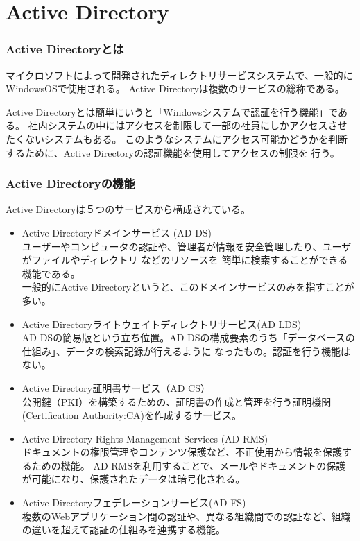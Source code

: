 \documentclass[11pt,a4j,titlepage]{jreport}
\begin{document}
\section{Active Directory}\label{Active Directory}
\subsubsection*{Active Directoryとは}
マイクロソフトによって開発されたディレクトリサービスシステムで、一般的にWindowsOSで使用される。
Active Directoryは複数のサービスの総称である。


Active Directoryとは簡単にいうと「Windowsシステムで認証を行う機能」である。
社内システムの中にはアクセスを制限して一部の社員にしかアクセスさせたくないシステムもある。
このようなシステムにアクセス可能かどうかを判断するために、Active Directoryの認証機能を使用してアクセスの制限を
行う。

\subsubsection*{Active Directoryの機能}

Active Directoryは５つのサービスから構成されている。

\begin{itemize}

    \item  Active Directoryドメインサービス (AD DS)\mbox{}\\
    ユーザーやコンピュータの認証や、管理者が情報を安全管理したり、ユーザがファイルやディレクトリ などのリソースを
    簡単に検索することができる機能である。\\
    一般的にActive Directoryというと、このドメインサービスのみを指すことが多い。
    
    \item Active Directoryライトウェイトディレクトリサービス(AD LDS)\mbox{}\\
    AD DSの簡易版という立ち位置。AD DSの構成要素のうち「データベースの仕組み」、データの検索記録が行えるように
    なったもの。認証を行う機能はない。

    \item Active Directory証明書サービス（AD CS）\mbox{}\\
    公開鍵（PKI）を構築するための、証明書の作成と管理を行う証明機関(Certification Authority:CA)を作成するサービス。
    
    \item Active Directory Rights Management Services (AD RMS)\mbox{}\\
    ドキュメントの権限管理やコンテンツ保護など、不正使用から情報を保護するための機能。
    AD RMSを利用することで、メールやドキュメントの保護が可能になり、保護されたデータは暗号化される。

    \item Active Directoryフェデレーションサービス(AD FS)\mbox{}\\
    複数のWebアプリケーション間の認証や、異なる組織間での認証など、組織の違いを超えて認証の仕組みを連携する機能。

\end{itemize}
\end{document}
